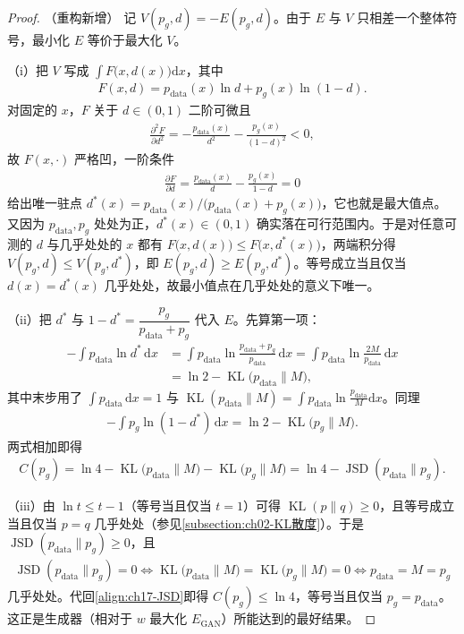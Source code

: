 \documentclass[../../main.tex]{subfiles}
\begin{document}
\begin{proof}（重构新增）
记 $V(p_g,d)=-E(p_g,d)$。由于 $E$ 与 $V$ 只相差一个整体符号，最小化 $E$ 等价于最大化 $V$。

（i）把 $V$ 写成 $\int F\big(x,d(x)\big)\mathrm{d}x$，其中
\begin{align*}
F(x,d)=p_{\mathrm{data}}(x)\ln d+p_g(x)\ln(1-d).
\end{align*}
对固定的 $x$，$F$ 关于 $d\in(0,1)$ 二阶可微且
\begin{align*}
\frac{\partial^2F}{\partial d^2}=-\frac{p_{\mathrm{data}}(x)}{d^2}-\frac{p_g(x)}{(1-d)^2}<0,
\end{align*}
故 $F(x,\cdot)$ 严格凹，一阶条件
\begin{align*}
\frac{\partial F}{\partial d}=\frac{p_{\mathrm{data}}(x)}{d}-\frac{p_g(x)}{1-d}=0
\end{align*}
给出唯一驻点 $d^*(x)=p_{\mathrm{data}}(x)/\big(p_{\mathrm{data}}(x)+p_g(x)\big)$，它也就是最大值点。又因为 $p_{\mathrm{data}},p_g$ 处处为正，$d^*(x)\in(0,1)$ 确实落在可行范围内。于是对任意可测的 $d$ 与几乎处处的 $x$ 都有 $F\big(x,d(x)\big)\leqslant F\big(x,d^*(x)\big)$，两端积分得 $V(p_g,d)\leqslant V(p_g,d^*)$，即 $E(p_g,d)\geqslant E(p_g,d^*)$。等号成立当且仅当 $d(x)=d^*(x)$ 几乎处处，故最小值点在几乎处处的意义下唯一。

（ii）把 $d^*$ 与 $1-d^*=\dfrac{p_g}{p_{\mathrm{data}}+p_g}$ 代入 $E$。先算第一项：
\begin{align*}
-\int p_{\mathrm{data}}\ln d^*\,\mathrm{d}x
&=\int p_{\mathrm{data}}\ln\frac{p_{\mathrm{data}}+p_g}{p_{\mathrm{data}}}\,\mathrm{d}x
=\int p_{\mathrm{data}}\ln\frac{2M}{p_{\mathrm{data}}}\,\mathrm{d}x\\
&=\ln 2-\operatorname{KL}\big(p_{\mathrm{data}}\|M\big),
\end{align*}
其中末步用了 $\int p_{\mathrm{data}}\,\mathrm{d}x=1$ 与 $\operatorname{KL}(p_{\mathrm{data}}\|M)=\int p_{\mathrm{data}}\ln\frac{p_{\mathrm{data}}}{M}\mathrm{d}x$。同理
\begin{align*}
-\int p_g\ln(1-d^*)\,\mathrm{d}x=\ln 2-\operatorname{KL}\big(p_g\|M\big).
\end{align*}
两式相加即得
\begin{align*}
C(p_g)=\ln 4-\operatorname{KL}\big(p_{\mathrm{data}}\|M\big)-\operatorname{KL}\big(p_g\|M\big)=\ln 4-\operatorname{JSD}(p_{\mathrm{data}}\|p_g).
\end{align*}

（iii）由 $\ln t\leqslant t-1$（等号当且仅当 $t=1$）可得 $\operatorname{KL}(p\|q)\geqslant0$，且等号成立当且仅当 $p=q$ 几乎处处（参见\cref{subsection:ch02-KL散度}）。于是 $\operatorname{JSD}(p_{\mathrm{data}}\|p_g)\geqslant0$，且
\begin{align*}
\operatorname{JSD}(p_{\mathrm{data}}\|p_g)=0
\iff \operatorname{KL}\big(p_{\mathrm{data}}\|M\big)=\operatorname{KL}\big(p_g\|M\big)=0
\iff p_{\mathrm{data}}=M=p_g
\end{align*}
几乎处处。代回\eqref{align:ch17-JSD}即得 $C(p_g)\leqslant\ln 4$，等号当且仅当 $p_g=p_{\mathrm{data}}$。这正是生成器（相对于 $w$ 最大化 $E_{\mathrm{GAN}}$）所能达到的最好结果。
\end{proof}
\end{document}
